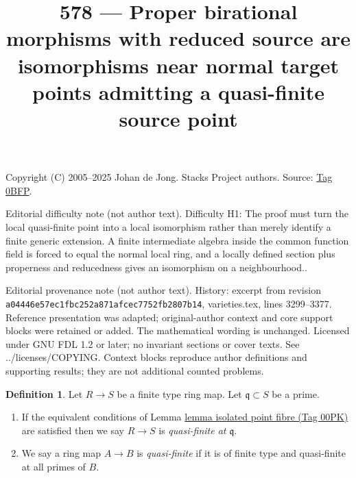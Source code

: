 \documentclass{amsart}
\theoremstyle{plain}
\theoremstyle{definition}
\newtheorem{definition}[subsection]{Definition}
\theoremstyle{remark}
\numberwithin{equation}{subsection}
\begin{document}
\title[Stacks Project, Tag 0BFP]{578 --- Proper birational morphisms with reduced source are isomorphisms near normal target points admitting a quasi-finite source point}
\maketitle
\noindent Copyright (C) 2005--2025 Johan de Jong. Stacks Project authors. Source: \href{https://stacks.math.columbia.edu/tag/0BFP}{Tag 0BFP}.

\noindent Editorial difficulty note (not author text). Difficulty H1: The proof must turn the local quasi-finite point into a local isomorphism rather than merely identify a finite generic extension. A finite intermediate algebra inside the common function field is forced to equal the normal local ring, and a locally defined section plus properness and reducedness gives an isomorphism on a neighbourhood..

\noindent Editorial provenance note (not author text). History: excerpt from revision \texttt{a0444\allowbreak 6e57e\allowbreak c1fbc\allowbreak 252a8\allowbreak 71afc\allowbreak ec775\allowbreak 2fb28\allowbreak 07b14}, varieties.tex, lines 3299--3377. Reference presentation was adapted; original-author context and core support blocks were retained or added. The mathematical wording is unchanged. Licensed under GNU FDL 1.2 or later; no invariant sections or cover texts. See ../licenses/COPYING. Context blocks reproduce author definitions and supporting results; they are not additional counted problems.

\begin{definition}
\label{algebra-definition-quasi-finite}
Let $R \to S$ be a finite type ring map.
Let $\mathfrak q \subset S$ be a prime.
\begin{enumerate}
\item If the equivalent conditions of Lemma \href{https://stacks.math.columbia.edu/tag/00PK}{lemma isolated point fibre (Tag 00PK)}
are satisfied then we say $R \to S$ is {\it quasi-finite at $\mathfrak q$}.
\item We say a ring map $A \to B$ is {\it quasi-finite}
if it is of finite type and quasi-finite at all primes of $B$.
\end{enumerate}
\end{definition}
\end{document}
